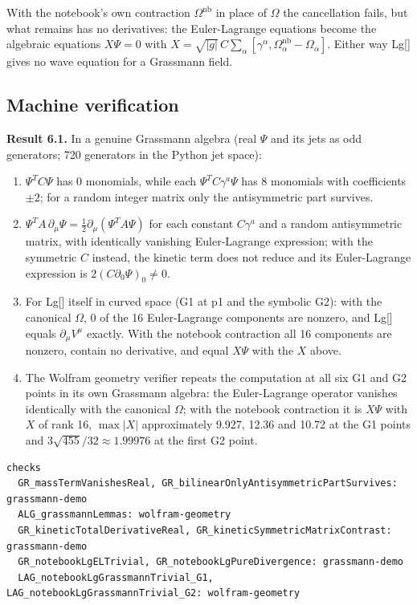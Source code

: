 \documentclass[11pt]{article}
\begin{document}
With the notebook's own contraction $\Omega^{\mathrm{nb}}$ in place of $\Omega$ the cancellation fails, but what remains has no derivatives: the Euler-Lagrange equations become the algebraic equations $X\Psi=0$ with $X=\sqrt{|g|}\,C\sum_\alpha[\gamma^\alpha,\Omega^{\mathrm{nb}}_\alpha-\Omega_\alpha]$. Either way Lg[] gives no wave equation for a Grassmann field.

\subsection{Machine verification}

\textbf{Result 6.1.} In a genuine Grassmann algebra (real $\Psi$ and its jets as odd generators; 720 generators in the Python jet space):

\begin{enumerate}
\item $\Psi^TC\Psi$ has 0 monomials, while each $\Psi^TC\gamma^a\Psi$ has 8 monomials with coefficients $\pm2$; for a random integer matrix only the antisymmetric part survives.
\item $\Psi^TA\,\partial_\mu\Psi=\tfrac12\partial_\mu(\Psi^TA\Psi)$ for each constant $C\gamma^a$ and a random antisymmetric matrix, with identically vanishing Euler-Lagrange expression; with the symmetric $C$ instead, the kinetic term does not reduce and its Euler-Lagrange expression is $2(C\partial_0\Psi)_0\ne0$.
\item For Lg[] itself in curved space (G1 at p1 and the symbolic G2): with the canonical $\Omega$, 0 of the 16 Euler-Lagrange components are nonzero, and Lg[] equals $\partial_\mu V^\mu$ exactly. With the notebook contraction all 16 components are nonzero, contain no derivative, and equal $X\Psi$ with the $X$ above.
\item The Wolfram geometry verifier repeats the computation at all six G1 and G2 points in its own Grassmann algebra: the Euler-Lagrange operator vanishes identically with the canonical $\Omega$; with the notebook contraction it is $X\Psi$ with $X$ of rank 16, $\max|X|$ approximately 9.927, 12.36 and 10.72 at the G1 points and $3\sqrt{455}/32\approx1.99976$ at the first G2 point.
\end{enumerate}

\begin{Verbatim}[fontsize=\small]
checks
  GR_massTermVanishesReal, GR_bilinearOnlyAntisymmetricPartSurvives: grassmann-demo
  ALG_grassmannLemmas: wolfram-geometry
  GR_kineticTotalDerivativeReal, GR_kineticSymmetricMatrixContrast: grassmann-demo
  GR_notebookLgELTrivial, GR_notebookLgPureDivergence: grassmann-demo
  LAG_notebookLgGrassmannTrivial_G1, LAG_notebookLgGrassmannTrivial_G2: wolfram-geometry
\end{Verbatim}
\end{document}
